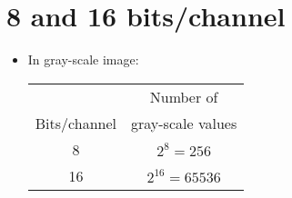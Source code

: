 \section{8 and 16 bits/channel}
\begin{itemize}
\item In gray-scale image:
  \begin{center}
    \begin{tabular}{c|c}
      & Number of \\
      Bits/channel & gray-scale values \\
      \hline
      8 & $2^8=256$ \\
      16 & $2^{16}=65536$
    \end{tabular}
  \end{center}
\end{itemize}
